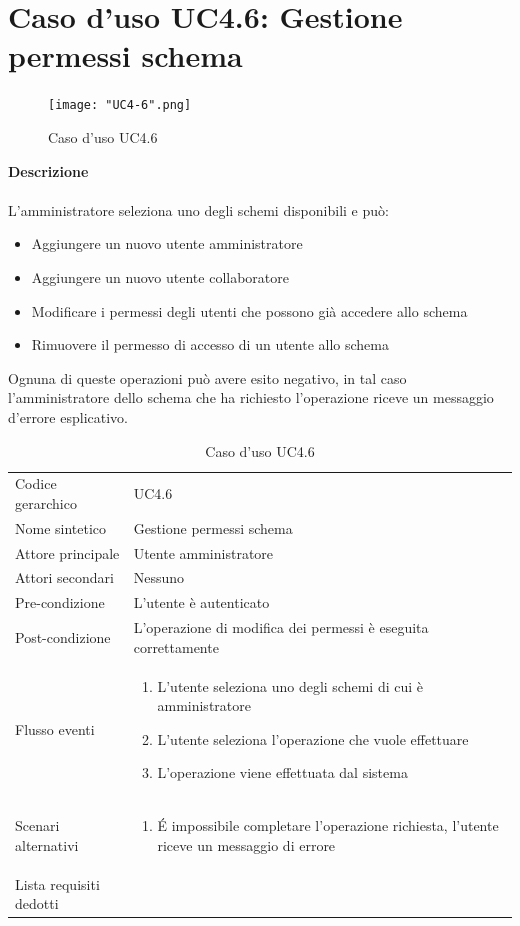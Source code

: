 \documentclass[a4paper]{report}
\begin{document}
	 \section{Caso d'uso UC4.6: Gestione permessi schema}
	 	\begin{figure}[H]
			\centering
			\texttt{[image: "UC4-6".png]}
			\caption{Caso d'uso UC4.6}
		\end{figure}
	 \textbf{Descrizione} \\ \\
	 L'amministratore seleziona uno degli schemi disponibili e può:
	 \begin{itemize}
	 	\item Aggiungere un nuovo utente amministratore
	 	\item Aggiungere un nuovo utente collaboratore
	 	\item Modificare i permessi degli utenti che possono già accedere allo schema
	 	\item Rimuovere il permesso di accesso di un utente allo schema
	 \end{itemize}
	 Ognuna di queste operazioni può avere esito negativo, in tal caso l'amministratore dello schema che ha
	 richiesto l'operazione riceve un messaggio d'errore esplicativo.
		\begin{table}[H]
		\begin{tabularx}{\textwidth}{X | X}\toprule
			\rowcolor{orange!65}Codice gerarchico & UC4.6 \\
			Nome sintetico & Gestione permessi schema \\
			\rowcolor{orange!65}Attore principale & Utente amministratore\\
			Attori secondari & Nessuno \\
			\rowcolor{orange!65}Pre-condizione & L'utente è autenticato\\
			Post-condizione & L'operazione di modifica dei permessi è eseguita correttamente \\
			\rowcolor{orange!65}Flusso eventi & \begin{enumerate}
			\item L'utente seleziona uno degli schemi di cui è amministratore
			\item L'utente seleziona l'operazione che vuole effettuare
			\item L'operazione viene effettuata dal sistema
			\end{enumerate} \\
			Scenari alternativi & \begin{enumerate}
			\item \'E impossibile completare l'operazione richiesta, l'utente riceve un messaggio di errore
			\end{enumerate} \\
			\rowcolor{orange!65}Lista requisiti dedotti & \\
			\bottomrule
		\end{tabularx}
		\caption{Caso d'uso UC4.6}
	 \end{table}
\end{document}
